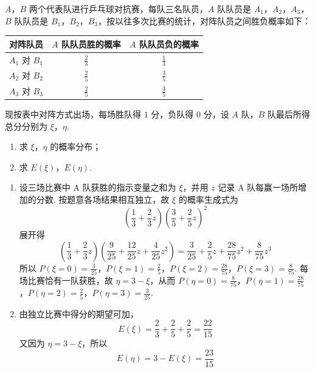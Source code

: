 \begin{problem}
\(A\)，\(B\) 两个代表队进行乒乓球对抗赛，每队三名队员，\(A\) 队队员是 \(A_1\)，\(A_2\)，\(A_3\)，\(B\) 队队员是 \(B_1\)，\(B_2\)，\(B_3\)，按以往多次比赛的统计，对阵队员之间胜负概率如下：

\begin{center}
\begin{tabular}{|c|c|c|}
\hline
对阵队员 & \(A\) 队队员胜的概率 & \(A\) 队队员负的概率 \\
\hline
\(A_1\) 对 \(B_1\) & \(\frac{2}{3}\) & \(\frac{1}{3}\) \\
\hline
\(A_2\) 对 \(B_2\) & \(\frac{2}{5}\) & \(\frac{3}{5}\) \\
\hline
\(A_3\) 对 \(B_3\) & \(\frac{2}{5}\) & \(\frac{3}{5}\) \\
\hline
\end{tabular}
\end{center}

现按表中对阵方式出场，每场胜队得 \(1\text{ 分}\)，负队得 \(0\text{ 分}\)，设 \(A\) 队，\(B\) 队最后所得总分分别为 \(\xi\)，\(\eta\).

\begin{enumerate}
\item 求 \(\xi\)，\(\eta\) 的概率分布；
\item 求 \(E(\xi)\)，\(E(\eta)\).
\end{enumerate}
\end{problem}

\begin{solution}
\begin{enumerate}
\item 设三场比赛中 A 队获胜的指示变量之和为 \(\xi\)，并用 \(z\) 记录 A 队每赢一场所增加的分数. 按题意各场结果相互独立，故 \(\xi\) 的概率生成式为
\[
\left(\frac13+\frac23z\right)\left(\frac35+\frac25z\right)^2
\]
展开得
\[
\left(\frac13+\frac23z\right)\left(\frac9{25}+\frac{12}{25}z+\frac4{25}z^2\right)=\frac3{25}+\frac25z+\frac{28}{75}z^2+\frac8{75}z^3
\]
所以
\(P(\xi=0)=\frac3{25}\)，\(P(\xi=1)=\frac25\)，\(P(\xi=2)=\frac{28}{75}\)，\(P(\xi=3)=\frac8{75}\).
每场比赛恰有一队获胜，故 \(\eta=3-\xi\)，从而
\(P(\eta=0)=\frac8{75}\)，\(P(\eta=1)=\frac{28}{75}\)，\(P(\eta=2)=\frac25\)，\(P(\eta=3)=\frac3{25}\).

\item 由独立比赛中得分的期望可加，
\[
E(\xi)=\frac23+\frac25+\frac25=\frac{22}{15}
\]
又因为 \(\eta=3-\xi\)，所以
\[
E(\eta)=3-E(\xi)=\frac{23}{15}
\]
\end{enumerate}
\end{solution}

